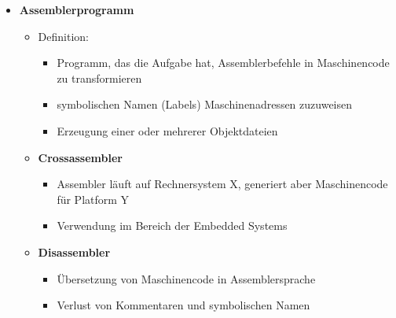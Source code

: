 \begin{itemize}
        \item \textbf{Assemblerprogramm}
            \begin{itemize}
                \item Definition: 
                    \begin{itemize}
                        \item Programm, das die Aufgabe hat, Assemblerbefehle in Maschinencode zu transformieren
                        \item symbolischen Namen (Labels) Maschinenadressen zuzuweisen
                        \item Erzeugung einer oder mehrerer Objektdateien
                    \end{itemize}

                \item \textbf{Crossassembler}
                    \begin{itemize}
                        \item Assembler läuft auf Rechnersystem X, generiert aber Maschinencode für Platform Y
                        \item Verwendung im Bereich der Embedded Systems
                    \end{itemize}
                
                \item \textbf{Disassembler}
                    \begin{itemize}
                        \item Übersetzung von Maschinencode in Assemblersprache
                        \item Verlust von Kommentaren und symbolischen Namen
                    \end{itemize}
            \end{itemize}


\end{itemize}

